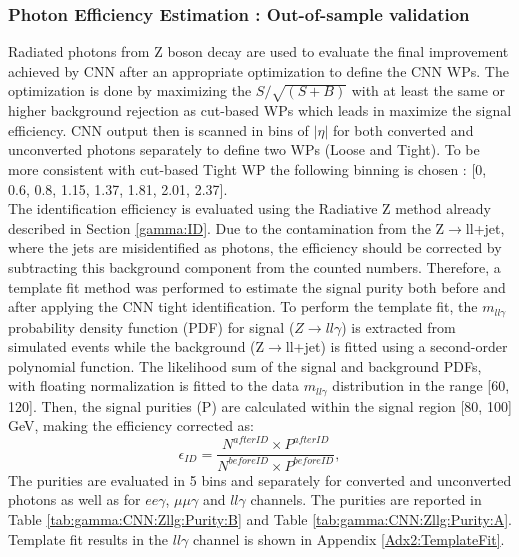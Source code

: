 \subsubsection{Photon Efficiency Estimation : Out-of-sample validation}
\label{gamma:CNN:Zllg}
Radiated photons from Z boson decay are used to evaluate the final improvement achieved by CNN after an appropriate optimization to define the CNN WPs. The optimization is done by maximizing the $S/\sqrt{(S+B)}$ with at least the same or higher background rejection as cut-based WPs which leads in maximize the signal efficiency. CNN output then is scanned in bins of $|\eta|$ for both converted and unconverted photons separately to define two WPs (Loose and Tight). To be more consistent with cut-based Tight WP the following binning is chosen : [0, 0.6, 0.8, 1.15, 1.37, 1.81, 2.01, 2.37]. \\
The identification efficiency is evaluated using the Radiative Z method already described in Section \ref{gamma:ID}. Due to the contamination from the Z$\rightarrow$ll+jet, where the jets are misidentified as photons, the efficiency should be corrected by subtracting this background component from the counted numbers. Therefore, a template fit method was performed to estimate the signal purity both before and after applying the CNN tight identification. To perform the template fit, the $m_{ll\gamma}$ probability density function (PDF) for signal ($Z\rightarrow ll\gamma$) is extracted from simulated events while the background (Z$\rightarrow$ll+jet) is fitted using a second-order polynomial function. The likelihood sum of the signal and background PDFs, with floating normalization is fitted to the data $m_{ll\gamma}$ distribution in the range [60, 120]. Then, the signal purities (P) are calculated within the signal region [80, 100] GeV, making the efficiency corrected as: 
\begin{equation}
    \epsilon_{ID} = \frac{N^{after ID}\times P^{after ID}}{N^{before ID} \times P^{before ID}},
\end{equation}
The purities are evaluated in 5 \pT bins and separately for converted and unconverted photons as well as for $ee\gamma$, $\mu\mu\gamma$ and $ll\gamma$ channels. The purities are reported in Table \ref{tab:gamma:CNN:Zllg:Purity:B} and Table \ref{tab:gamma:CNN:Zllg:Purity:A}. Template fit results in the $ll\gamma$ channel is shown in Appendix \ref{Adx2:TemplateFit}.

